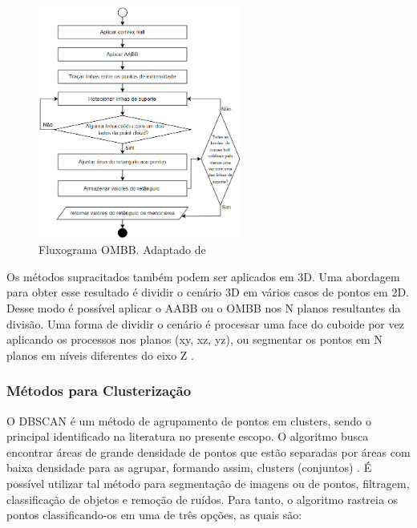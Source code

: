         \begin{figure}[h]
           \centering
           \includegraphics[width=0.6\textwidth]{imagens/fluxogramaOMBB.png} 
           \caption{Fluxograma OMBB. Adaptado de \cite{david_2014_computing}}
           \label{fig:fluxogramaOMBB}
        \end{figure}

    Os métodos supracitados também podem ser aplicados em 3D. Uma abordagem para obter esse resultado é dividir o cenário 3D em vários casos de pontos em 2D. Desse modo é possível aplicar o AABB ou o OMBB nos N planos resultantes da divisão. Uma forma de dividir o cenário é processar uma face do cuboide por vez aplicando os processos nos planos (xy, xz, yz), ou segmentar os pontos em N planos em níveis diferentes do eixo Z \cite{siwei_2021_review, mousavian_2017_3d}.
   
   
    
\subsubsection{Métodos para Clusterização}
\label{subsec_Metodos para Clusterização}

    O DBSCAN é um método de agrupamento de pontos em clusters, sendo o principal identificado na literatura no presente escopo. O algoritmo busca encontrar áreas de grande densidade de pontos que estão separadas por áreas com baixa densidade para as agrupar, formando assim, clusters (conjuntos) \cite{schubert_2017_dbscan, harman_2020_dbscan}. É possível utilizar tal método para segmentação de imagens ou de pontos, filtragem, classificação de objetos e remoção de ruídos. Para tanto, o algoritmo rastreia os pontos classificando-os em uma de três opções, as quais são: 
    
